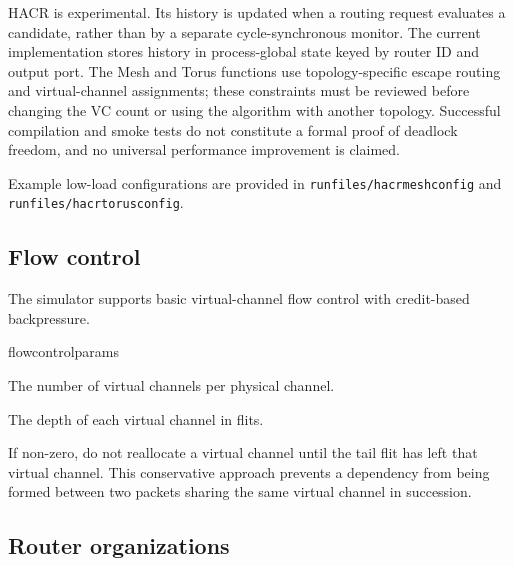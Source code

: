 \documentclass[11pt]{article}
\begin{document}
HACR is experimental. Its history is updated when a routing request
evaluates a candidate, rather than by a separate cycle-synchronous
monitor. The current implementation stores history in process-global
state keyed by router ID and output port. The Mesh and Torus functions
use topology-specific escape routing and virtual-channel assignments;
these constraints must be reviewed before changing the VC count or
using the algorithm with another topology. Successful compilation and
smoke tests do not constitute a formal proof of deadlock freedom, and
no universal performance improvement is claimed.

Example low-load configurations are provided in
\texttt{runfiles/hacrmeshconfig} and \texttt{runfiles/hacrtorusconfig}.

\subsection{Flow control}

The simulator supports basic virtual-channel flow control with
credit-based backpressure.  

\begin{opt_list}{flowcontrolparams}

\item[num\_vcs] The number of virtual channels per physical channel.

\item[vc\_buf\_size] The depth of each virtual channel in flits.


  
\item[wait\_for\_tail\_credit] If non-zero, do not reallocate a virtual
channel until the tail flit has left that virtual channel.  This
conservative approach prevents a dependency from being formed between
two packets sharing the same virtual channel in succession.
\end{opt_list}

\subsection{Router organizations}
\end{document}
